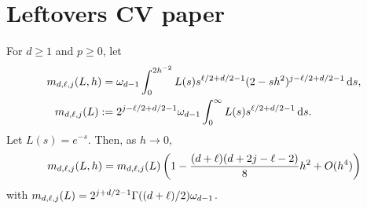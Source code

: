 \documentclass{article}
\begin{document}
\section{Leftovers CV paper}


\begin{lemma}\label{lem:mdp}
For $d\geq1$ and $p\geq0$, let
\begin{align*}
    m_{d,\ell,j}(L,h)=&\;\omega_{d-1}\int_0^{2h^{-2}}L(s)s^{\ell/2+d/2-1}(2-sh^2)^{j-\ell/2+d/2-1}\,\mathrm{d} s,\\
    m_{d,\ell,j}(L):=&\; 2^{j-\ell/2+d/2-1}\omega_{d-1}\int_0^{\infty}L(s)s^{\ell/2+d/2-1}\,\mathrm{d} s.
\end{align*}
Let $L(s)=e^{-s}$. Then, as $h\to0$,
\begin{align*}
    m_{d,\ell,j}(L,h)=m_{d,\ell,j}(L)\left(1-\frac{(d+\ell)(d+2j-\ell-2)}{8}h^2+O(h^{4})\right)
\end{align*}
with $m_{d,\ell,j}(L)=2^{j+d/2-1} \Gamma((d+\ell)/2)\omega_{d-1}$.
\end{lemma}
\end{document}
